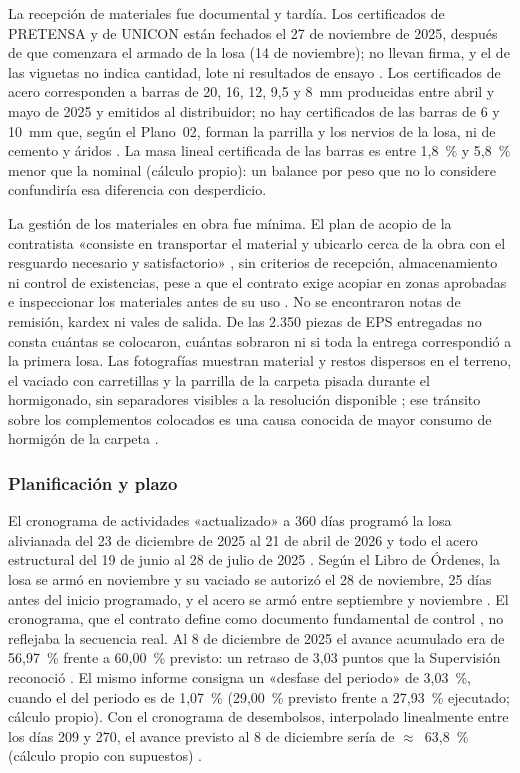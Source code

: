 La recepción de materiales fue documental y tardía. Los certificados de PRETENSA y de UNICON están fechados el 27 de noviembre de 2025, después de que comenzara el armado de la losa (14 de noviembre); no llevan firma, y el de las viguetas no indica cantidad, lote ni resultados de ensayo \parencite[pp.~80--81, 122]{uatf2025pao2}. Los certificados de acero corresponden a barras de 20, 16, 12, 9,5 y 8~mm producidas entre abril y mayo de 2025 y emitidos al distribuidor; no hay certificados de las barras de 6 y 10~mm que, según el Plano~02, forman la parrilla y los nervios de la losa, ni de cemento y áridos \parencite[pp.~82--86]{uatf2025pao2}. La masa lineal certificada de las barras es entre 1,8~\% y 5,8~\% menor que la nominal (cálculo propio): un balance por peso que no lo considere confundiría esa diferencia con desperdicio.

La gestión de los materiales en obra fue mínima. El plan de acopio de la contratista «consiste en transportar el material y ubicarlo cerca de la obra con el resguardo necesario y satisfactorio» \parencite[p.~10]{uatf2025pao2}, sin criterios de recepción, almacenamiento ni control de existencias, pese a que el contrato exige acopiar en zonas aprobadas e inspeccionar los materiales antes de su uso \parencite[p.~102]{uatf2025pao2}. No se encontraron notas de remisión, kardex ni vales de salida. De las 2.350 piezas de EPS entregadas \parencite{unicon2025} no consta cuántas se colocaron, cuántas sobraron ni si toda la entrega correspondió a la primera losa. Las fotografías muestran material y restos dispersos en el terreno, el vaciado con carretillas y la parrilla de la carpeta pisada durante el hormigonado, sin separadores visibles a la resolución disponible \parencite[pp.~75--76]{uatf2025pao2}; ese tránsito sobre los complementos colocados es una causa conocida de mayor consumo de hormigón de la carpeta \parencite{concretec2016plastoformo}.

\subsubsection{Planificación y plazo}
El cronograma de actividades «actualizado» a 360 días programó la losa alivianada del 23 de diciembre de 2025 al 21 de abril de 2026 y todo el acero estructural del 19 de junio al 28 de julio de 2025 \parencite[p.~137]{uatf2025pao2}. Según el Libro de Órdenes, la losa se armó en noviembre y su vaciado se autorizó el 28 de noviembre, 25 días antes del inicio programado, y el acero se armó entre septiembre y noviembre \parencite[pp.~114--125]{uatf2025pao2}. El cronograma, que el contrato define como documento fundamental de control \parencite[p.~105]{uatf2025pao2}, no reflejaba la secuencia real. Al 8 de diciembre de 2025 el avance acumulado era de 56,97~\% frente a 60,00~\% previsto: un retraso de 3,03 puntos que la Supervisión reconoció \parencite[p.~10]{uatf2025pao2}. El mismo informe consigna un «desfase del periodo» de 3,03~\%, cuando el del periodo es de 1,07~\% (29,00~\% previsto frente a 27,93~\% ejecutado; cálculo propio). Con el cronograma de desembolsos, interpolado linealmente entre los días 209 y 270, el avance previsto al 8 de diciembre sería de $\approx$~63,8~\% (cálculo propio con supuestos) \parencite[p.~139]{uatf2025pao2}.

